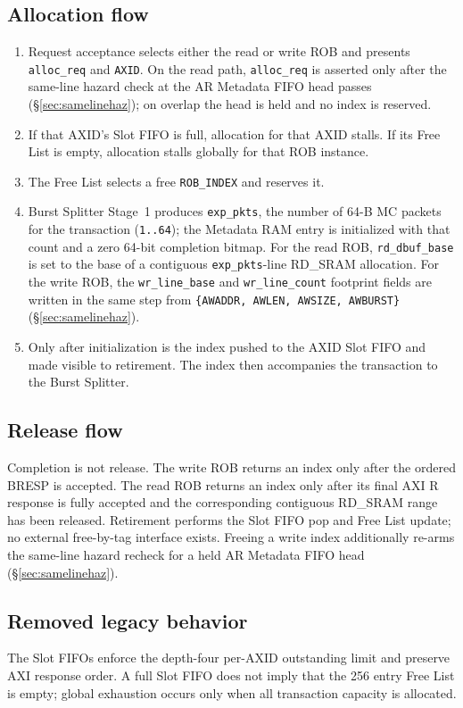 \subsection{Allocation flow}
\begin{enumerate}[noitemsep]
  \item Request acceptance selects either the read or write ROB and presents
        \texttt{alloc\_req} and \texttt{AXID}.  On the read path,
        \texttt{alloc\_req} is asserted only after the same-line hazard check
        at the AR Metadata FIFO head passes (\S\ref{sec:samelinehaz}); on
        overlap the head is held and no index is reserved.
  \item If that AXID's Slot FIFO is full, allocation for that AXID stalls.
        If its Free List is empty, allocation stalls globally for that ROB
        instance.
  \item The Free List selects a free \texttt{ROB\_INDEX} and reserves it.
  \item Burst Splitter Stage~1 produces \texttt{exp\_pkts}, the number of
        64-B MC packets for the transaction (\texttt{1..64}); the Metadata
        RAM entry is initialized with that count and a zero 64-bit
        completion bitmap.  For the read ROB, \texttt{rd\_dbuf\_base} is set
        to the base of a contiguous \texttt{exp\_pkts}-line RD\_SRAM
        allocation.  For the write ROB, the \texttt{wr\_line\_base} and
        \texttt{wr\_line\_count} footprint fields are written in the same
        step from \texttt{\{AWADDR, AWLEN, AWSIZE, AWBURST\}}
        (\S\ref{sec:samelinehaz}).
  \item Only after initialization is the index pushed to the AXID Slot FIFO
        and made visible to retirement.  The index then accompanies the
        transaction to the Burst Splitter.
\end{enumerate}

\subsection{Release flow}

Completion is not release.  The write ROB returns an index only after the
ordered BRESP is accepted.  The read ROB returns an index only after its final
AXI R response is fully accepted and the corresponding contiguous RD\_SRAM
range has been released.  Retirement performs the Slot FIFO pop and Free List
update; no external free-by-tag interface exists.  Freeing a write index
additionally re-arms the same-line hazard recheck for a held AR Metadata FIFO
head (\S\ref{sec:samelinehaz}).

\subsection{Removed legacy behavior}

The Slot FIFOs enforce the depth-four per-AXID outstanding limit and preserve
AXI response order.  A full Slot FIFO does not imply that the 256 entry Free
List is empty; global exhaustion occurs only when all transaction capacity is
allocated.
